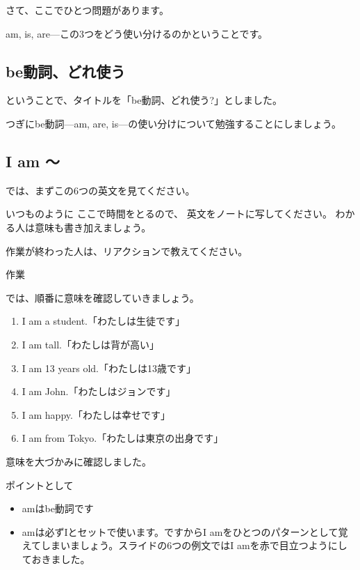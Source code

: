 \documentclass[12pt]{jlreq}
\begin{document}
さて、ここでひとつ問題があります。

am, is, are---この3つをどう使い分けるのかということです。

{\large \ComputerMouse}
\subsection{be動詞、どれ使う}

ということで、タイトルを「be動詞、どれ使う?」としました。

つぎにbe動詞---am, are, is---の使い分けについて勉強することにしましょう。

{\large \ComputerMouse}

\subsection{I am 〜}
{\large \ComputerMouse}

では、まずこの6つの英文を見てください。

いつものように
ここで時間をとるので、
英文をノートに写してください。
わかる人は意味も書き加えましょう。

作業が終わった人は、リアクションで教えてください。

\hrulefill{}

\hfill{}作業\hfill{}

\hrulefill

では、順番に意味を確認していきましょう。


\begin{enumerate}
 \item  I am a student.「わたしは生徒です」
 \item  I am tall.「わたしは背が高い」
 \item  I am 13 years old.「わたしは13歳です」
 \item  I am John.「わたしはジョンです」
 \item  I am happy.「わたしは幸せです」
 \item  I am from Tokyo.「わたしは東京の出身です」
\end{enumerate}

意味を大づかみに確認しました。

ポイントとして
\begin{itemize}
 \item amはbe動詞です
 \item amは必ずIとセットで使います。ですからI amをひとつのパターンとして覚えてしまいましょう。スライドの6つの例文ではI amを赤で目立つようにしておきました。
\end{itemize}
\end{document}
